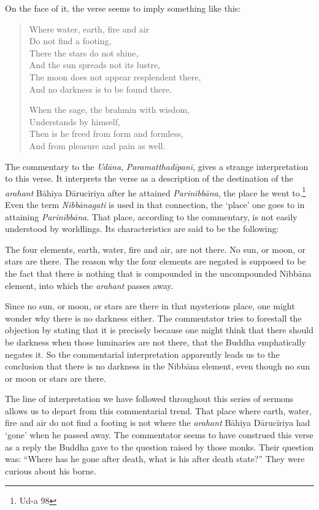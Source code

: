 On the face of it, the verse seems to imply something like this:

\begin{quote}
Where water, earth, fire and air\\
Do not find a footing,\\
There the stars do not shine,\\
And the sun spreads not its lustre,\\
The moon does not appear resplendent there,\\
And no darkness is to be found there.

When the sage, the brahmin with wisdom,\\
Understands by himself,\\
Then is he freed from form and formless,\\
And from pleasure and pain as well.
\end{quote}

The commentary to the \emph{Udāna}, \emph{Paramatthadīpanī}, gives a strange interpretation to this verse. It interprets the verse as a description of the destination of the \emph{arahant} Bāhiya Dārucīriya after he attained \emph{Parinibbāna}, the place he went to.\footnote{Ud-a 98} Even the term \emph{Nibbānagati} is used in that connection, the `place' one goes to in attaining \emph{Parinibbāna}. That place, according to the commentary, is not easily understood by worldlings. Its characteristics are said to be the following:

The four elements, earth, water, fire and air, are not there. No sun, or moon, or stars are there. The reason why the four elements are negated is supposed to be the fact that there is nothing that is compounded in the uncompounded Nibbāna element, into which the \emph{arahant} passes away.

Since no sun, or moon, or stars are there in that mysterious place, one might wonder why there is no darkness either. The commentator tries to forestall the objection by stating that it is precisely because one might think that there should be darkness when those luminaries are not there, that the Buddha emphatically negates it. So the commentarial interpretation apparently leads us to the conclusion that there is no darkness in the Nibbāna element, even though no sun or moon or stars are there.

The line of interpretation we have followed throughout this series of sermons allows us to depart from this commentarial trend. That place where earth, water, fire and air do not find a footing is not where the \emph{arahant} Bāhiya Dārucīriya had `gone' when he passed away. The commentator seems to have construed this verse as a reply the Buddha gave to the question raised by those monks. Their question was: ``Where has he gone after death, what is his after death state?'' They were curious about his borne.

